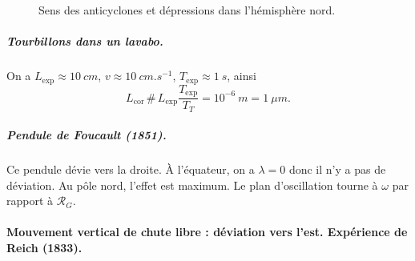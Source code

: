 \begin{figure}
                        \caption{Sens des anticyclones et dépressions dans l'hémisphère nord.}
                        \label{fig:anticyclone_depression_hemisphere_nord}
                    \end{figure}

                \subparagraph{Tourbillons dans un lavabo.}

                    On a $L_{\text{exp}}\approx 10~cm$, $v\approx 10~cm.s^{-1}$, $T_{\text{exp}}\approx 1~s$, ainsi 
                    \begin{equation*}
                        L_{\text{cor}}\,\#\,L_{\text{exp}}\frac{T_{\text{exp}}}{T_T}=10^{-6}~m=1~\mu m.
                    \end{equation*}

                \subparagraph{Pendule de Foucault (1851).} Ce pendule dévie vers la droite. À l'équateur, on a $\lambda=0$ donc il n'y a pas de déviation. Au pôle nord, l'effet est maximum. Le plan d'oscillation tourne à $\omega$ par rapport à $\mathcal{R}_{G}$.
            
            \paragraph{Mouvement vertical de chute libre : déviation vers l'est. Expérience de Reich (1833).}

